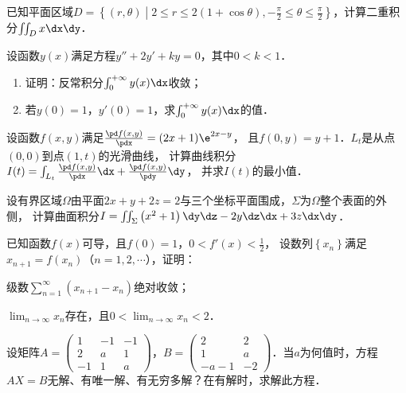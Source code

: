 \documentclass[plain,noanswer,medmath]{../../template/jnuexam}
\begin{document}


\begin{problem}[points=10]
已知平面区域$D = \left\{(r,\theta)\middle| 2 \le r \le 2(1+\cos\theta),
- \frac{\pi}{2} \le \theta \le \frac{\pi}{2} \right\}$，\goodbreak 计算二重积分$\iint_D x\dx\dy$．
\end{problem}


\begin{problem}[points=10]
设函数$y(x)$满足方程$y'' + 2y' + ky = 0$，其中$0 < k < 1$．
\begin{enumerate}
\item 证明：反常积分$\int_0^{+\infty} y(x)\dx$收敛；
\item 若$y(0) = 1$，$y'(0) = 1$，求$\int_0^{+\infty} y(x)\dx$的值．
\end{enumerate}
\end{problem}


\begin{problem}[points=10]
设函数$f(x,y)$满足$\frac{\pd f(x,y)}{\pdx} = (2x + 1)\e^{2x - y}$，
且$f(0,y) = y + 1$．$L_t$是从点$(0,0)$到点$(1,t)$的光滑曲线，
计算曲线积分$I(t) = \int_{L_t} \frac{\pd f(x,y)}{\pdx}\dx + \frac{\pd f(x,y)}{\pdy}\dy$，
并求$I(t)$的最小值．
\end{problem}


\begin{problem}[points=10]
设有界区域$\Omega$由平面$2x + y + 2z = 2$与三个坐标平面围成，$\Sigma$为$\Omega$整个表面的外侧，
计算曲面积分$I = \iint_{\Sigma}\left(x^2 + 1 \right)\dy\dz - 2y\dz\dx + 3z\dx\dy$．
\end{problem}


\begin{problem}[points=10]
已知函数$f(x)$可导，且$f(0) = 1$，$0 < f'(x) < \frac{1}{2}$，
设数列$\left\{x_n \right\}$满足$x_{n + 1} = f(x_n)$（$n = 1,2, \cdots$），证明：\par
\begin{enumerate*}
\item 级数$\mathop{\sum}\limits_{n = 1}^{\infty}(x_{n + 1} - x_n)$绝对收敛；
\item $\lim_{n \to \infty} x_n$存在，且$0 < \lim_{n \to \infty} x_n < 2$．
\end{enumerate*}
\end{problem}


\begin{problem}[points=11]
设矩阵$A = \begin{pmatrix}
   1 & -1 & -1 \\
   2 &  a & 1 \\
  -1 &  1 & a
\end{pmatrix}$，$B = \begin{pmatrix}
       2 & 2 \\
       1 & a \\
  -a - 1 & -2
\end{pmatrix}$．当$a$为何值时，方程$AX = B$无解、有唯一解、有无穷多解？在有解时，求解此方程．
\end{problem}
\end{document}
